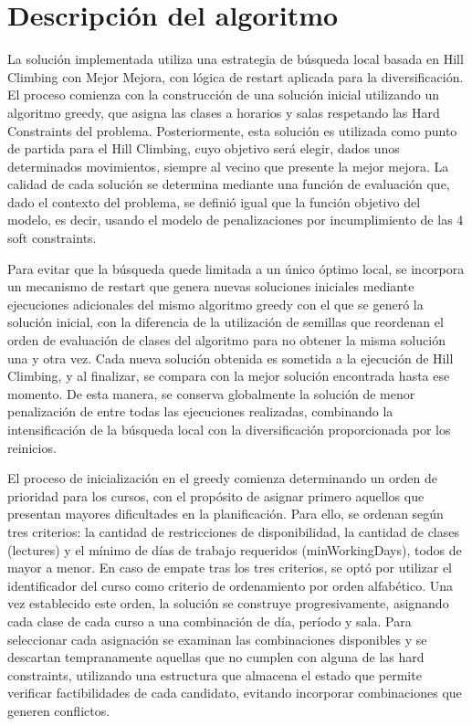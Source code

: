 \documentclass[letter, 10pt]{article}
\begin{document}
\section{Descripci\'on del algoritmo}
La soluci\'on implementada utiliza una estrategia de b\'usqueda local basada en Hill Climbing con Mejor Mejora, con l\'ogica de restart aplicada para la diversificaci\'on. El proceso comienza con la construcci\'on de una soluci\'on inicial utilizando un algoritmo greedy, que asigna las clases a horarios y salas respetando las Hard Constraints del problema. Posteriormente, esta soluci\'on es utilizada como punto de partida para el Hill Climbing, cuyo objetivo ser\'a elegir, dados unos determinados movimientos, siempre al vecino que presente la mejor mejora. La calidad de cada soluci\'on se determina mediante una funci\'on de evaluaci\'on que, dado el contexto del problema, se defini\'o igual que la funci\'on objetivo del modelo, es decir, usando el modelo de penalizaciones por incumplimiento de las 4 soft constraints.

Para evitar que la b\'usqueda quede limitada a un \'unico \'optimo local, se incorpora un mecanismo de restart que genera nuevas soluciones iniciales mediante ejecuciones adicionales del mismo algoritmo greedy con el que se gener\'o la soluci\'on inicial, con la diferencia de la utilizaci\'on de semillas que reordenan el orden de evaluaci\'on de clases del algoritmo para no obtener la misma soluci\'on una y otra vez. Cada nueva soluci\'on obtenida es sometida a la ejecuci\'on de Hill Climbing, y al finalizar, se compara con la mejor soluci\'on encontrada hasta ese momento. De esta manera, se conserva globalmente la soluci\'on de menor penalizaci\'on de entre todas las ejecuciones realizadas, combinando la intensificaci\'on de la b\'usqueda local con la diversificaci\'on proporcionada por los reinicios.

El proceso de inicializaci\'on en el greedy comienza determinando un orden de prioridad para los cursos, con el prop\'osito de asignar primero aquellos que presentan mayores dificultades en la planificaci\'on. Para ello, se ordenan seg\'un tres criterios: la cantidad de restricciones de disponibilidad, la cantidad de clases (lectures) y el m\'inimo de d\'ias de trabajo requeridos (minWorkingDays), todos de mayor a menor. En caso de empate tras los tres criterios, se opt\'o por utilizar el identificador del curso como criterio de ordenamiento por orden alfab\'etico. Una vez establecido este orden, la soluci\'on se construye progresivamente, asignando cada clase de cada curso a una combinaci\'on de d\'ia, per\'iodo y sala. Para seleccionar cada asignaci\'on se examinan las combinaciones disponibles y se descartan tempranamente aquellas que no cumplen con alguna de las hard constraints, utilizando una estructura que almacena el estado que permite verificar factibilidades de cada candidato, evitando incorporar combinaciones que generen conflictos.
\end{document}
